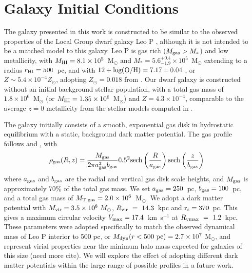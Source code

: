 \documentclass[twocolumn]{aastex61}
\begin{document}
\section{Galaxy Initial Conditions}
\label{sec:IC}
The galaxy presented in this work is constructed to be similar to the observed properties of the Local Group dwarf galaxy Leo P \citep{Giovanelli2013,McQuinn2013,McQuinn2015a,McQuinn2015}, although it is not intended to be a matched model to this galaxy. Leo P is gas rich ($M_{\rm gas} > M_{*}$) and low metallicity, with $M_{\rm HI} = 8.1\times 10^{5}$~M$_{\odot}$ and $M_{*} = 5.6^{+0.4}_{-1.9} \times 10^{5}$~M$_{\odot}$ \citep{McQuinn2015a} extending to a radius $r_{\rm HI} = 500$~pc, and with $12 + \rm{log(O/H)} = 7.17 \pm 0.04$ \citep{Skillman2013}, or $Z \sim 5.4\times10^{-4} Z_{\odot}$, adopting $Z_{\odot} = 0.018$ from \citet{Asplund2009}. Our dwarf galaxy is constructed without an initial background stellar population, with a total gas mass of $1.8 \times 10^{6}$~M$_{\odot}$ (or $M_{\rm HI} = 1.35 \times 10^{6}$~M$_{\odot}$) and $Z = 4.3\times 10^{-4}$, comparable to the average $z = 0$ metallicity from the stellar models computed in \citet{McQuinn2015}.

The galaxy initially consists of a smooth, exponential gas disk in hydrostatic equilibrium with a static, background dark matter potential. The gas profile follows \citet{Tonnesen2009} and \citet{Salem2015}, with
\begin{equation}
\rho_{\rm gas} (R,z) = \frac{M_{\rm gas}}{2\pi a^2_{\rm gas}b_{\rm gas}} 0.5^2{\rm sech}\left(\frac{R}{a_{\rm gas}}\right){\rm sech}\left(\frac{z}{b_{\rm gas}}\right)
\end{equation}
where $a_{\rm gas}$ and $b_{\rm gas}$ are the radial and vertical gas disk scale heights, and $M_{\rm gas}$ is approximately 70\% of the total gas mass. We set $a_{\rm gas} = 250$~pc, $b_{\rm gas} = 100$~pc, and a total gas mass of $M_{\rm T,gas} = 2.0\times 10^6$~M$_{\odot}$. We adopt a \citet{Burkert1995} dark matter potential with $M_{\rm vir} = 3.5\times 10^{8}~M_{\odot}$, $R_{\rm vir}~=~14.3$~kpc and r$_{\rm s} = 370$~pc. This gives a maximum circular velocity $V_{\rm max} = 17.4$~km~s$^{-1}$ at $R_{\rm vmax}~=~1.2$~kpc. These parameters were adopted specifically to match the observed dynamical mass of Leo P interior to 500 pc, or $M_{\rm dyn} (r < 500~\rm{pc}) = 2.7\times 10^{7}$ M$_{\odot}$, and represent virial properties near the minimum halo mass expected for galaxies of this size \citep{Ferrero2012} (need more cite). We will explore the effect of adopting different dark matter potentials within the large range of possible profiles in a future work.
\end{document}
